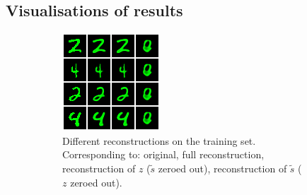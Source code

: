 \subsection{Visualisations of results}\label{sec:qual-results}
\begin{figure}[tp]
  \centering
  \begin{subfigure}[b]{0.49\columnwidth}
    \centering
    \includegraphics[width=\textwidth]{supmatch/example_images/copper-microwave-2174_train_reconstructions_9900.png}
    \caption{
    Different reconstructions on the training set. Corresponding to: original, full reconstruction,
    reconstruction of $z$ ($\tilde{s}$ zeroed out), reconstruction of $\tilde{s}$ ($z$ zeroed out).
    }%
    \label{fig:cmnist-recon-training}
  \end{subfigure}
   \hfill
  \begin{subfigure}[b]{0.49\columnwidth}
    \centering

\end{subfigure}
\end{figure}
